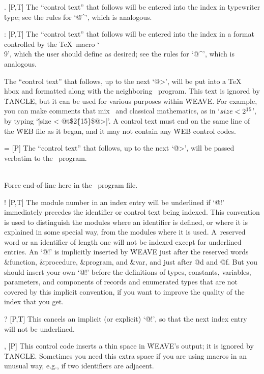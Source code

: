 \@. [P,T] The ``control text'' that follows will be entered into the index
in \.{typewriter} \.{type}; see the rules for `\.{@\^}', which is analogous.

\@: [P,T] The ``control text'' that follows will be entered into the index
in a format controlled by the \TeX\ macro `\.{\\9}', which the user
should define as desired; see the rules for `\.{@\^}', which is analogous.

\@t [P] The ``control text'' that follows, up to the next `\.{@>}', will
be put into a \TeX\ \.{\\hbox} and formatted along with the neighboring
\PASCAL\ program. This text is ignored by \.{TANGLE}, but it can be used
for various purposes within \.{WEAVE}. For example, you can make comments
that mix \PASCAL\ and classical mathematics, as in `$\\{size}<2^{15}$', by
typing `\.{|size < @t\$2\^\{15\}\$@>|}'.  A control text must end on the
same line of the \.{WEB} file as it began, and it may not contain any
\.{WEB} control codes.

\@= [P] The ``control text'' that follows, up to the next `\.{@>}', will
be passed verbatim to the \PASCAL\ program.

\@\\ [P] Force end-of-line here in the \PASCAL\ program file.

\@! [P,T] The module number in an index entry will be underlined if `\.{@!}'
immediately precedes the identifier or control text being indexed. This
convention is used to distinguish the modules where an identifier is
defined, or where it is explained in some special way, from the modules
where it is used. A~reserved word or an identifier of length one will not
be indexed except for underlined entries. An `\.{@!}' is implicitly inserted
by \.{WEAVE} just after the reserved words \&{function}, \&{procedure},
\&{program}, and \&{var}, and just after \.{@d} and \.{@f}. But you should
insert your own `\.{@!}' before the definitions of types, constants,
variables, parameters, and components of records and enumerated types that
are not covered by this implicit convention, if you want to improve the
quality of the index that you get.

\@? [P,T] This cancels an implicit (or explicit) `\.{@!}', so that the next
index entry will not be underlined.

\@, [P] This control code inserts a thin space in \.{WEAVE}'s output; it is
ignored by \.{TANGLE}. Sometimes you need this extra space if you are using
macros in an unusual way, e.g., if two identifiers are adjacent.

